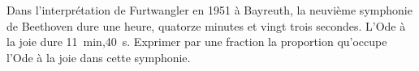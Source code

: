
\begin{exercice}\label{exosmath-0819}

    Dans l'interprétation de Furtwangler en 1951 à Bayreuth, la neuvième symphonie de Beethoven dure une heure, quatorze minutes et vingt trois secondes. L'Ode à la joie dure \SI{11}{\minute},\SI{40}{\second}. Exprimer par une fraction la proportion qu'occupe l'Ode à la joie dans cette symphonie.

\end{exercice}
